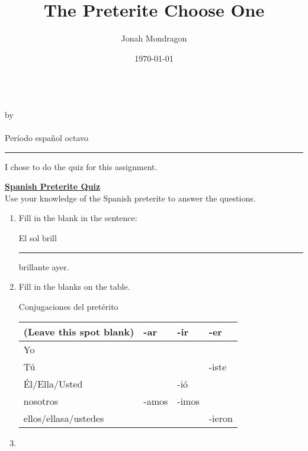 \documentclass[12pt]{article}
\newcommand{\PutTitle}[1]
{
    \begin{center}
        {\huge\bfseries\thetitle}\\
        by \theauthor\\
        \thedate\\
        #1        
    \end{center}
    \hrule
    \vspace{2ex}
}
\begin{document}
\title{The Preterite Choose One}
\author{Jonah Mondragon}
\date{\today}
\PutTitle{Período español octavo}

\doublespacing

I chose to do the quiz for this assignment.

\begin{center}
    {\huge\bfseries\underline{Spanish Preterite Quiz}}\\
    Use your knowledge of the Spanish preterite to answer the questions.
\end{center}

\begin{enumerate}
\item{Fill in the blank in the sentence:}
    \begin{addmargin}[24pt]{0pt}
    El sol brill\rule[-0.75pt]{5ex}{0.4pt} brillante ayer.
    \end{addmargin}
\item{Fill in the blanks on the table.}
    \begin{table}[h]
        \centering
        Conjugaciones del pretérito\\
        \begin{tabular}{|l|l|l|l|}
        \hline
            (Leave this spot blank) & -ar & -ir & -er \\ \hline
            Yo & & & \\ \hline
            Tú & & & -iste \\ \hline
            Él/Ella/Usted &  & -ió & \\ \hline
            nosotros & -amos & -imos &  \\ \hline
            ellos/ellasa/ustedes &  &  & -ieron \\ \hline
        \end{tabular}
    \end{table}
\item{}
\end{enumerate}
\end{document}
